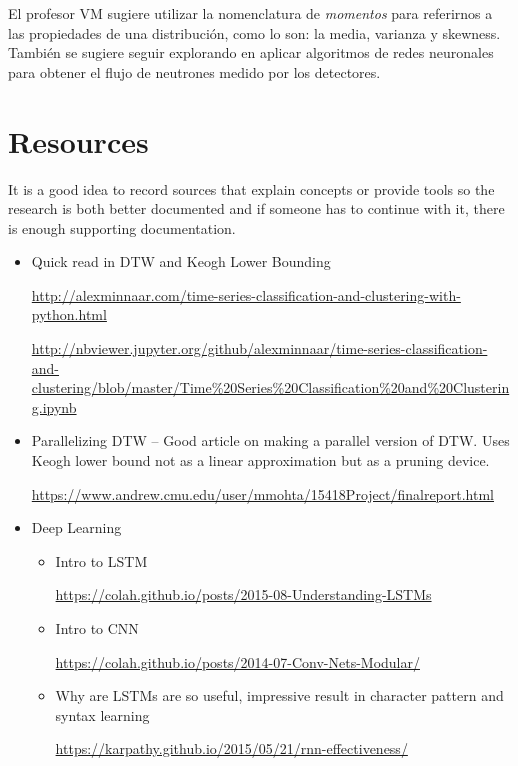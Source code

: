 \documentclass[11pt,letterpaper]{article}
\begin{document}
El profesor VM sugiere utilizar la nomenclatura de \textit{momentos} para referirnos a las propiedades de una distribución, como lo son: la media, varianza y skewness. También se sugiere seguir explorando en aplicar algoritmos de redes neuronales para obtener el flujo de neutrones medido por los detectores.

\clearpage
\appendix
\section{Resources}
\begin{tip}
It is a good idea to record sources that explain concepts or provide tools so the research is both better documented and if someone has to continue with it, there is enough supporting documentation.
\end{tip}
\begin{itemize}
    \item Quick read in DTW and Keogh Lower Bounding

\url{http://alexminnaar.com/time-series-classification-and-clustering-with-python.html}

\url{http://nbviewer.jupyter.org/github/alexminnaar/time-series-classification-and-clustering/blob/master/Time%20Series%20Classification%20and%20Clustering.ipynb}
    \item Parallelizing DTW -- Good article on making a parallel version of DTW. Uses Keogh lower bound not as a linear approximation but as a pruning device.

    \url{https://www.andrew.cmu.edu/user/mmohta/15418Project/finalreport.html}

    \item Deep Learning
    \begin{itemize}
        \item Intro to LSTM

        \url{https://colah.github.io/posts/2015-08-Understanding-LSTMs}
        
        \item Intro to CNN

        \url{https://colah.github.io/posts/2014-07-Conv-Nets-Modular/}

        \item Why are LSTMs are so useful, impressive result in character pattern and syntax learning

        \url{https://karpathy.github.io/2015/05/21/rnn-effectiveness/}
    \end{itemize}
\end{itemize}
\end{document}
